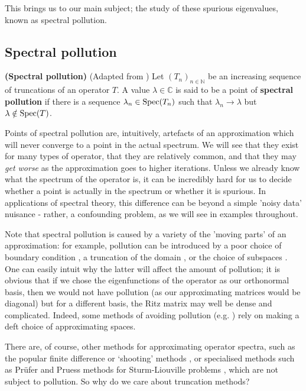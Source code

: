 \documentclass[../main.tex]{subfiles}
\begin{document}
This brings us to our main subject; the study of these spurious eigenvalues, known as spectral pollution.

\subsection{Spectral pollution}

\begin{definition}{\textbf{(Spectral pollution)}}
(Adapted from \parencite{davies1995spectral})
Let $(T_n)_{n \in \mathbb{N}}$ be an increasing sequence of truncations of an
operator $T$. A value $\lambda \in \mathbb{C}$ is said to be a point of
\textbf{spectral pollution} if there is a sequence $\lambda_n \in \mathrm{Spec}(T_n)$
such that $\lambda_n \rightarrow \lambda$ but $\lambda \notin \mathrm{Spec}(T)$.
\end{definition}

Points of spectral pollution are, intuitively, artefacts of an approximation
which will never converge to a point in the actual spectrum. We will see that
they exist for many types of operator, 
that they are relatively common, and that they may \emph{get worse} as
the approximation goes to higher iterations. Unless we already know what the
spectrum of the operator is, it can be incredibly hard for us to decide whether
a point is actually in the spectrum or whether it is
spurious. In applications of spectral theory, this difference can be beyond a
simple 'noisy data' nuisance - rather, a confounding problem, as we will see
in examples throughout.

Note that spectral pollution is caused by a variety of the 'moving parts' of
an approximation: for example, pollution can be introduced by a poor choice
of boundary condition \cite{cances2012periodic}, a truncation of the domain
\cite{aceto2006numerical}, or the choice of subspaces \cite{levitin2002spectral}.
One can easily intuit why the latter will affect the amount of pollution; it is
obvious that if we chose the eigenfunctions of the operator as our orthonormal basis,
then we would not have pollution (as our approximating matrices would be diagonal)
but for a different basis, the Ritz matrix may well be dense and complicated. Indeed,
some methods of avoiding pollution (e.g. \cite{boffi1999pollution}) rely on making
a deft choice of approximating spaces.

There are, of course, other methods for approximating operator spectra, such as
the popular finite difference or `shooting' methods \cite{suli2003introduction},
or specialised methods such as Pr\"ufer and Pruess methods for Sturm-Liouville
problems \cite{pryce1993numerical}, which are not subject to pollution. So why
do we care about truncation methods?
\end{document}
